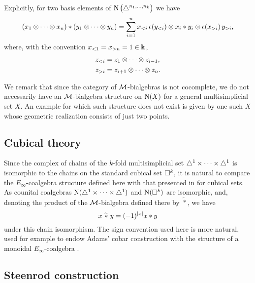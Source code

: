 Explicitly, for two basis elements of $\operatorname{N}\big(\triangle^{n_1,\dots,n_k}\big)$ we have
\[
(x_1 \otimes \dotsb \otimes x_n) \ast (y_1 \otimes \dotsb \otimes y_n) =
\sum_{i=1}^n x_{<i}\, \epsilon(y_{<i}) \otimes x_i \ast y_i \otimes \epsilon(x_{>i}) \, y_{>i},
\]
where, with the convention $x_{<1} = x_{>n} = 1 \in \Bbbk$,
\begin{align*}
	z_{<i} & = z_1 \otimes \dotsb \otimes z_{i-1}, \\
	z_{>i} & = z_{i+1} \otimes \dotsb \otimes z_n.
\end{align*}

We remark that since the category of $\mathcal{M}$-bialgebras is not cocomplete, we do not necessarily have an $\mathcal{M}$-bialgebra structure on $\operatorname{N}(X)$ for a general multisimplicial set $X$.
An example for which such structure does not exist is given by one such $X$ whose geometric realization consists of just two points.

\subsection{Cubical theory}\label{ss:cubical}

Since the complex of chains of the $k$-fold multisimplicial set $\triangle^{1}\times\dots\times\triangle^{1}$ is isomorphic to the chains on the standard cubical set $\square^k$, it is natural to compare the $E_\infty$-coalgebra structure defined here with that presented in \cite{medina2022cube_einfty} for cubical sets.
As counital coalgebras $\operatorname{N}(\triangle^{1}\times\dots\times\triangle^{1})$ and $\operatorname{N}(\square^k)$ are isomorphic, and, denoting the product of the $\mathcal{M}$-bialgebra defined there by $\widetilde\ast$, we have
\[
x \ \widetilde\ast \ y = (-1)^{\lvert x\rvert} x \ast y
\]
under this chain isomorphism.
The sign convention used here is more natural, used for example to endow Adams' cobar construction with the structure of a monoidal $E_\infty$-coalgebra \cite{medina2021cobar}.

\subsection{Steenrod construction}\label{ss:cup coproducts}

